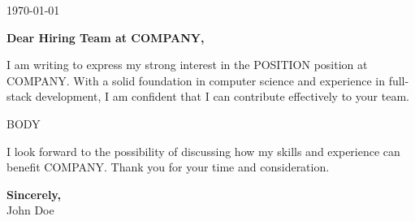 \documentclass[11pt,letterpaper]{article}
\begin{document}
\begin{flushright}
  \today
\end{flushright}

\vspace{12pt}

\textbf{Dear Hiring Team at {{COMPANY}},}

\vspace{8pt}

I am writing to express my strong interest in the {{POSITION}} position at {{COMPANY}}. With a solid foundation in computer science and experience in full-stack development, I am confident that I can contribute effectively to your team.

{{BODY}}

I look forward to the possibility of discussing how my skills and experience can benefit {{COMPANY}}. Thank you for your time and consideration.

\vspace{16pt}

\textbf{Sincerely,}\\
John Doe
\end{document}
